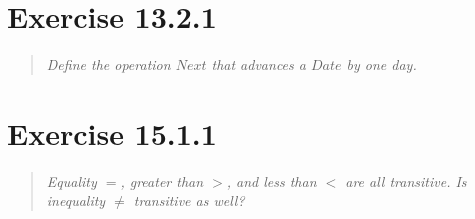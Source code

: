 \documentclass[10pt]{article}
\begin{document}
\section{Exercise 13.2.1}
\begin{quote}
  {\it
    Define the operation $Next$ that advances a $Date$ by one day.
  }
\end{quote}



\section{Exercise 15.1.1}
\begin{quote}
  {\it
    Equality $=$, greater than $>$, and less than $<$ are all transitive. Is inequality $\neq$
    transitive as well?
  }
\end{quote}
\end{document}
